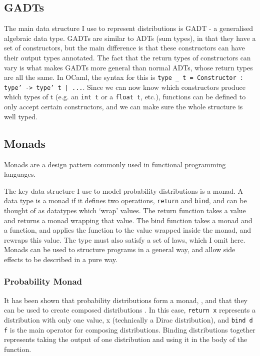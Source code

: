 \subsection{GADTs}
The main data structure I use to represent distributions is GADT - a generalised algebraic data type. GADTs are similar to ADTs (sum types), in that they have a set of constructors, but the main difference is that these constructors can have their output types annotated. The fact that the return types of constructors can vary is what makes GADTs more general than normal ADTs, whose return types are all the same. In OCaml, the syntax for this is \texttt{type \_ t = Constructor : type' -> type' t | ...}. Since we can now know which constructors produce which types of t (e.g. an \texttt{int t} or a \texttt{float t}, etc.), functions can be defined to only accept certain constructors, and we can make sure the whole structure is well typed.

\subsection{Monads}
Monads are a design pattern commonly used in functional programming languages.

The key data structure I use to model probability distributions is a monad. A data type is a monad if it defines two operations, \texttt{return} and \texttt{bind}, and can be thought of as datatypes which `wrap' values. The return function takes a value and returns a monad wrapping that value. The bind function takes a monad and a function, and applies the function to the value wrapped inside the monad, and rewraps this value. The type must also satisfy a set of laws, which I omit here\cite{wadler1990comprehending}. Monads can be used to structure programs in a general way, and allow side effects to be described in a pure way.

\subsubsection{Probability Monad}
It has been shown that probability distributions form a monad, \cite{giry1982categorical} \cite{jones1989probabilistic}, and that they can be used to create composed distributions \cite{ramsey2002stochastic}. In this case, \texttt{return x} represents a distribution with only one value, x (technically a Dirac distribution), and \texttt{bind d f} is the main operator for composing distributions. Binding distributions together represents taking the output of one distribution and using it in the body of the function.

